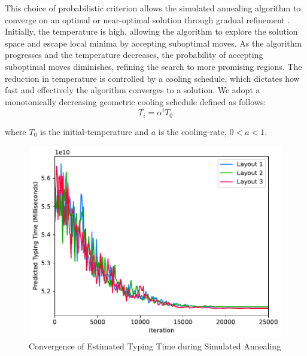 This choice of probabilistic criterion allows the simulated annealing algorithm to converge on an optimal or near-optimal solution through gradual refinement \citep{granville1994simulated}. Initially, the temperature is high, allowing the algorithm to explore the solution space and escape local minima by accepting suboptimal moves. As the algorithm progresses and the temperature decreases, the probability of accepting suboptimal moves diminishes, refining the search to more promising regions. The reduction in temperature is controlled by a cooling schedule, which dictates how fast and effectively the algorithm converges to a solution. We adopt a monotonically decreasing geometric cooling schedule defined as follows:
\begin{equation*}
T_i = \alpha^i T_0
\end{equation*}

\noindent where $T_0$ is the initial-temperature and $a$ is the cooling-rate, $0 < a < 1$.

\begin{figure}[h]
\includegraphics[width=\columnwidth]{figures/convergence.pdf}
\caption{Convergence of Estimated Typing Time during Simulated Annealing}
\label{fig:bigram_typing_time}
\end{figure}



